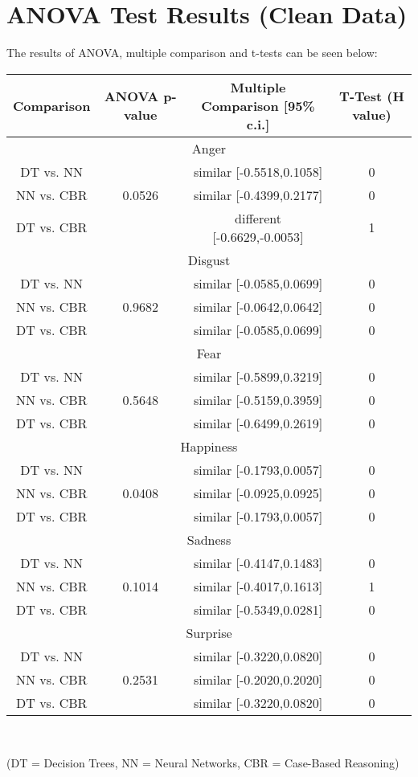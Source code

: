\documentclass[a4paper]{article}
\begin{document}
\newpage
\section{ANOVA Test Results (Clean Data)}

The results of ANOVA, multiple comparison and t-tests can be seen below:

\begin{center}
  \begin{tabular}{|c|c|c|c|}
  \hline
    {\bf Comparison} & {\bf ANOVA p-value} & {\bf Multiple Comparison [95\% c.i.]} & {\bf T-Test (H value)} \\
    \hline
    \multicolumn{4}{|c|}{Anger} \\ \hline
	DT vs. NN 	& 			& similar [-0.5518,0.1058] 	& 0 \\
	NN vs. CBR 	& 0.0526 	& similar [-0.4399,0.2177]	& 0 \\
	DT vs. CBR 	& 			& different [-0.6629,-0.0053] & 1 \\
	\hline
    \multicolumn{4}{|c|}{Disgust} \\ \hline
	DT vs. NN 	& 			& similar [-0.0585,0.0699]	& 0 \\
	NN vs. CBR 	& 0.9682 	& similar [-0.0642,0.0642]	& 0 \\
	DT vs. CBR 	& 			& similar [-0.0585,0.0699]	& 0 \\
	\hline
	\multicolumn{4}{|c|}{Fear} \\ \hline
	DT vs. NN 	& 			& similar [-0.5899,0.3219]	& 0 \\
	NN vs. CBR 	& 0.5648 	& similar [-0.5159,0.3959]  & 0 \\
	DT vs. CBR 	& 			& similar [-0.6499,0.2619]	& 0 \\
	\hline
	\multicolumn{4}{|c|}{Happiness} \\ \hline
	DT vs. NN 	& 			& similar [-0.1793,0.0057]	& 0 \\
	NN vs. CBR 	& 0.0408 	& similar [-0.0925,0.0925]	& 0 \\
	DT vs. CBR 	& 			& similar [-0.1793,0.0057]	& 0 \\
	\hline
	\multicolumn{4}{|c|}{Sadness} \\ \hline
	DT vs. NN 	& 			& similar [-0.4147,0.1483]	& 0 \\
	NN vs. CBR 	& 0.1014 	& similar [-0.4017,0.1613]	& 1 \\
	DT vs. CBR 	& 			& similar [-0.5349,0.0281]	& 0 \\
	\hline
	\multicolumn{4}{|c|}{Surprise} \\ \hline
	DT vs. NN 	& 			& similar [-0.3220,0.0820]	& 0 \\
	NN vs. CBR 	& 0.2531 	& similar [-0.2020,0.2020]	& 0 \\
	DT vs. CBR 	& 			& similar [-0.3220,0.0820]	& 0 \\
	\hline
  \end{tabular}\\
 \end{center}
 (DT = Decision Trees, NN = Neural Networks, CBR = Case-Based Reasoning)\\
 
\end{document}
